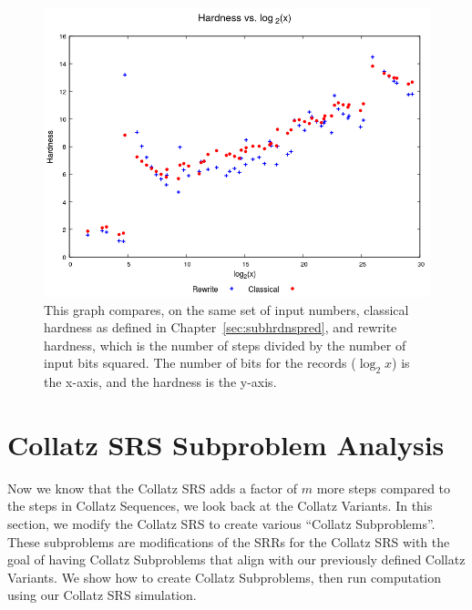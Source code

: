 \begin{figure}
    \centering
    \includegraphics[scale=0.75]{ModAvoidanceAnalysisPics/RvC_vs_log.png}
    \caption{This graph compares, on the same set of input numbers, classical hardness as defined in Chapter~\ref{sec:subhrdnspred}, and rewrite hardness, which is the number of steps divided by the number of input bits squared. The number of bits for the records ($\log_2{x}$) is the x-axis, and the hardness is the y-axis.}
    \label{fig:rvc_log}
\end{figure}


\section{Collatz SRS Subproblem Analysis} \label{subsec:collatzsubproblemananalysis}
Now we know that the Collatz SRS adds a factor of $m$ more steps compared to the steps in Collatz Sequences, we look back at the Collatz Variants. In this section, we modify the Collatz SRS to create various ``Collatz Subproblems''. These subproblems are modifications of the SRRs for the Collatz SRS with the goal of having Collatz Subproblems that align with our previously defined Collatz Variants. We show how to create Collatz Subproblems, then run computation using our Collatz SRS simulation.
